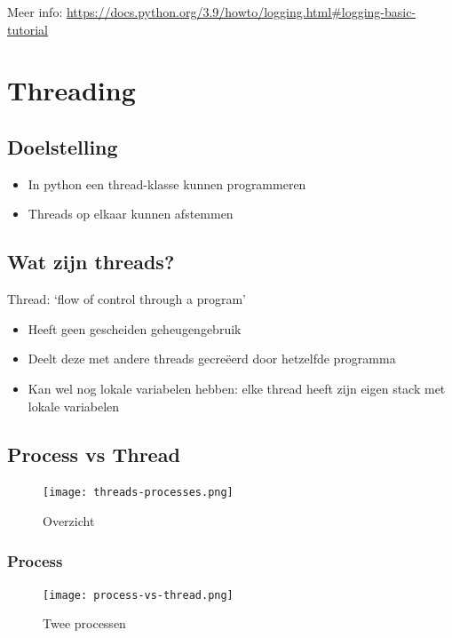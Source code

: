 \documentclass{article}
\begin{document}
Meer info: \url{https://docs.python.org/3.9/howto/logging.html#logging-basic-tutorial}

\section{Threading}

\subsection{Doelstelling}

\begin{itemize}
    \item In python een thread-klasse kunnen programmeren
    \item Threads op elkaar kunnen afstemmen
\end{itemize}

\subsection{Wat zijn threads?}

Thread: `flow of control through a program'
\begin{itemize}
    \item Heeft geen gescheiden geheugengebruik
    \item Deelt deze met andere threads gecreëerd door hetzelfde programma
    \item Kan wel nog lokale variabelen hebben: elke thread heeft zijn eigen stack met lokale variabelen
\end{itemize}

\subsection{Process vs Thread}

\begin{figure}[H]
    \centering
    \texttt{[image: threads-processes.png]}
    \caption{Overzicht}
\end{figure}


\subsubsection{Process}

\begin{figure}[H]
    \centering
    \texttt{[image: process-vs-thread.png]}
    \caption{Twee processen}
\end{figure}
\end{document}
